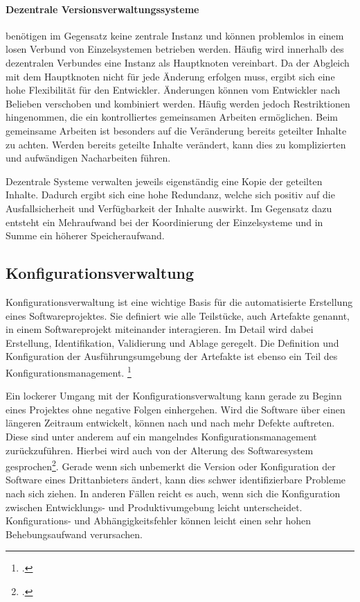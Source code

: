 \paragraph{Dezentrale Versionsverwaltungssysteme} benötigen im Gegensatz keine zentrale Instanz und können problemlos in einem losen Verbund von Einzelsystemen betrieben werden. 
Häufig wird innerhalb des dezentralen Verbundes eine Instanz als Hauptknoten vereinbart. Da der Abgleich mit dem Hauptknoten nicht für jede Änderung erfolgen muss, ergibt sich eine hohe Flexibilität für den Entwickler. Änderungen können vom Entwickler nach Belieben verschoben und kombiniert werden.
Häufig werden jedoch Restriktionen hingenommen, die ein kontrolliertes gemeinsamen Arbeiten ermöglichen. Beim gemeinsame Arbeiten ist besonders auf die Veränderung bereits geteilter Inhalte zu achten. Werden bereits geteilte Inhalte verändert, kann dies zu komplizierten und aufwändigen Nacharbeiten führen.
 
Dezentrale Systeme verwalten jeweils eigenständig eine Kopie der geteilten Inhalte. Dadurch ergibt sich eine hohe Redundanz, welche sich positiv auf die Ausfallsicherheit und Verfügbarkeit der Inhalte auswirkt. Im Gegensatz dazu entsteht ein Mehraufwand bei der Koordinierung der Einzelsysteme und in Summe ein höherer Speicheraufwand.

\subsection{Konfigurationsverwaltung}
\label{subsec:konfigurationsverwaltung}

Konfigurationsverwaltung ist eine wichtige Basis für die automatisierte Erstellung eines Softwareprojektes. Sie definiert wie alle Teilstücke, auch Artefakte genannt, in einem Softwareprojekt miteinander interagieren. Im Detail wird dabei Erstellung, Identifikation, Validierung und Ablage geregelt. Die Definition und Konfiguration der Ausführungsumgebung der 
Artefakte ist ebenso ein Teil des Konfigurationsmanagement. \footcite[vgl.][]{humble2010}

Ein lockerer Umgang mit der Konfigurationsverwaltung kann gerade zu Beginn eines Projektes ohne negative Folgen einhergehen. Wird die Software über einen längeren Zeitraum entwickelt, können nach und nach mehr Defekte auftreten. Diese sind unter anderem auf ein mangelndes Konfigurationsmanagement zurückzuführen. Hierbei wird auch von der Alterung des Softwaresystem gesprochen\footcite[vgl.][]{software-quality2008}. Gerade wenn sich unbemerkt die Version oder Konfiguration der Software eines Drittanbieters ändert, kann dies schwer identifizierbare Probleme nach sich ziehen. In anderen Fällen reicht es auch, wenn sich die Konfiguration zwischen Entwicklungs- und Produktivumgebung leicht unterscheidet. Konfigurations- und Abhängigkeitsfehler können leicht einen sehr hohen 
Behebungsaufwand verursachen.

